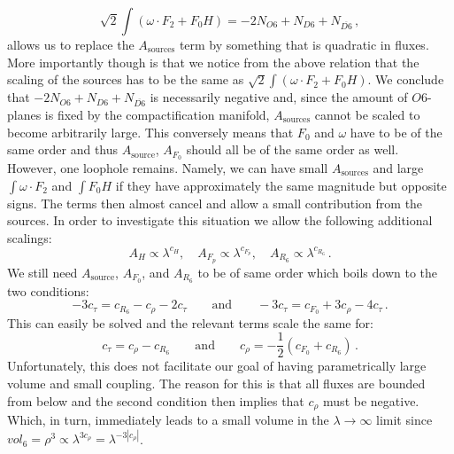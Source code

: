 \documentclass[a4paper,12pt,twoside,openright]{report}
\newcommand{\be}{\begin{equation}}
\newcommand{\ee}{\end{equation}}
\begin{document}
\be 
\sqrt{2} \int \left( \omega \cdot F_2 + F_0 H\right) = -2 N_{O6} + N_{D6} + N_{\overline{D6}}\,,
\ee
allows us to replace the $A_{\text{sources}}$ term by something that is quadratic in fluxes. More importantly though is that we notice from the above relation that the scaling of the sources has to be the same as $\sqrt{2} \int \left( \omega \cdot F_2 + F_0 H\right)$. We conclude that $-2 N_{O6} + N_{D6} + N_{\overline{D6}}$ is necessarily negative and, since the amount of $O6$-planes is fixed by the compactification manifold, $A_{\text{sources}}$ cannot be scaled to become arbitrarily large. This conversely means that $F_0$ and $\omega$ have to be of the same order and thus $A_{\text{source}}$, $A_{F_0}$ should all be of the same order as well.\\
However, one loophole remains. Namely, we can have small $A_{\text{sources}}$ and large $\int \omega \cdot F_2$ and $\int F_0 H$ if they have approximately the same magnitude but opposite signs. The terms then almost cancel and allow a small contribution from the sources. In order to investigate this situation we allow the following additional scalings:
\be 
A_H \propto \lambda^ {c_H}, \quad A_{F_p} \propto \lambda^ {c_{F_p}},\quad A_{R_6} \propto \lambda^ {c_{R_6}}\,.
\ee
We still need $A_{\text{source}}$, $A_{F_0}$, and $A_{R_6}$ to be of same order which boils down to the two conditions:
\be 
-3 c_\tau = c_{R_6} - c_\rho - 2 c_\tau \qquad \text{and} \qquad -3c_\tau = c_{F_0} + 3 c_\rho - 4 c_\tau\,.
\ee
This can easily be solved and the relevant terms scale the same for:
\be 
c_\tau = c_\rho - c_{R_6} \qquad \text{and} \qquad c_\rho = -\frac{1}{2} \left( c_{F_0} + c_{R_6} \right)\,.
\ee
Unfortunately, this does not facilitate our goal of having parametrically large volume and small coupling. The reason for this is that all fluxes are bounded from below and the second condition then implies that $c_\rho$ must be negative. Which, in turn, immediately leads to a small volume in the $\lambda \to \infty$ limit since $vol_6 = \rho^ 3 \propto \lambda^ {3 c_\rho} = \lambda^ {-3 |c_\rho|}$.\\
\end{document}
